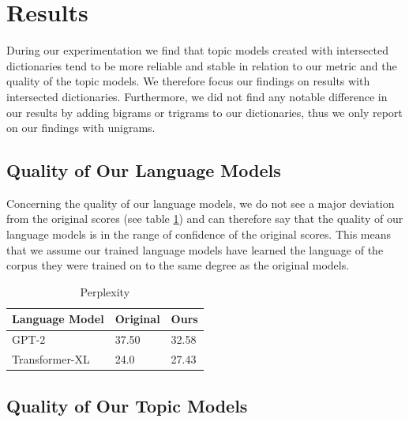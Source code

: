 \section{Results}\label{sec:results}
During our experimentation we find that topic models created with intersected dictionaries tend to be more reliable and stable in relation to our metric and the quality of the topic models. We therefore focus our findings on results with intersected dictionaries. Furthermore, we did not find any notable difference in our results by adding bigrams or trigrams to our dictionaries, thus we only report on our findings with unigrams.

\subsection{Quality of Our Language Models}
Concerning the quality of our language models, we do not see a major deviation from the original scores (see table \ref{tab:origcoh}) and can therefore say that the quality of our language models is in the range of confidence of the original scores. This means that we assume our trained language models have learned the language of the corpus they were trained on to the same degree as the original models.
\begin{table}[ht]
\caption{Perplexity}
\centering
    \begin{tabular}{ |p{3cm}||p{3cm}|p{3cm}|  }
        \hline
        Language Model & Original & Ours\\
        \hline
        \hline
        GPT-2          & 37.50 & 32.58\\
        \hline
        Transformer-XL & 24.0  & 27.43\\
        \hline
    \end{tabular}
\label{tab:origcoh}
\end{table}

\subsection{Quality of Our Topic Models}
